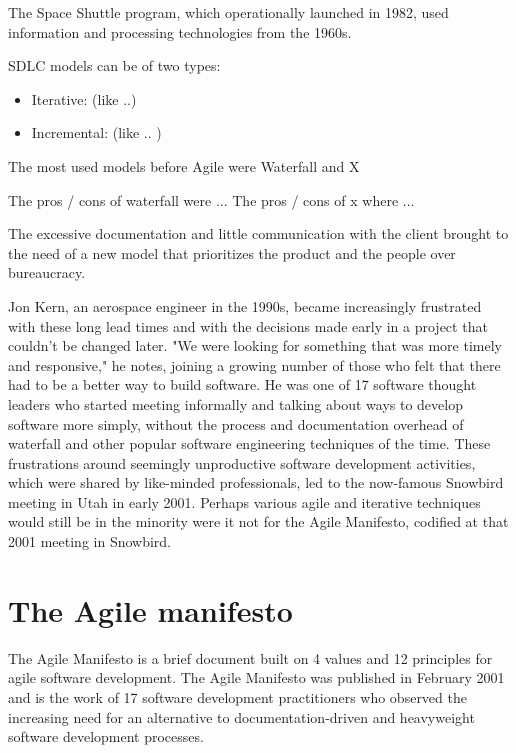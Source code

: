 	The Space Shuttle program, which operationally launched in 1982, used information and processing technologies from the 1960s.
	
	SDLC models can be of two types:
	\begin{itemize}
		\item Iterative: (like ..)
		\item Incremental: (like .. )
	\end{itemize}
	
	The most used models before Agile were Waterfall and X
	
	The pros / cons of waterfall were ... 
	The pros / cons of x where ...

	The excessive documentation and little communication with the client brought to the need of a new model that prioritizes the product and the people over bureaucracy. 

	Jon Kern, an aerospace engineer in the 1990s, became increasingly frustrated with these long lead times and with the decisions made early in a project that couldn't be changed later. "We were looking for something that was more timely and responsive," he notes, joining a growing number of those who felt that there had to be a better way to build software. He was one of 17 software thought leaders who started meeting informally and talking about ways to develop software more simply, without the process and documentation overhead of waterfall and other popular software engineering techniques of the time.
	These frustrations around seemingly unproductive software development activities, which were shared by like-minded professionals, led to the now-famous Snowbird meeting in Utah in early 2001.
	Perhaps various agile and iterative techniques would still be in the minority were it not for the Agile Manifesto, codified at that 2001 meeting in Snowbird.

\section{The Agile manifesto}

	The Agile Manifesto is a brief document built on 4 values and 12 principles for agile software development. The Agile Manifesto was published in February 2001 and is the work of 17 software development practitioners who observed the increasing need for an alternative to documentation-driven and heavyweight software development processes.
	
